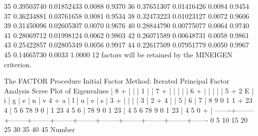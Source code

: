 \documentclass{article}
\begin{document}
\begin{Woutput}
  35    0.39503740    0.01852433        0.0088        0.9370
  36    0.37651307    0.01416426        0.0084        0.9454
  37    0.36234881    0.03761658        0.0081        0.9534
  38    0.32473223    0.01023127        0.0072        0.9606
  39    0.31450096    0.02605307        0.0070        0.9676
  40    0.28844790    0.00775077        0.0064        0.9740
  41    0.28069712    0.01998124        0.0062        0.9803
  42    0.26071589    0.00648731        0.0058        0.9861
  43    0.25422857    0.02805349        0.0056        0.9917
  44    0.22617509    0.07951779        0.0050        0.9967
  45    0.14665730                      0.0033        1.0000
12 factors will be retained by the MINEIGEN criterion.

The FACTOR Procedure
Initial Factor Method: Iterated Principal Factor Analysis
Scree Plot of Eigenvalues
    |
  8 +
    |
    |
    |        1
    |
    |
  7 +
    |
    |
    |
    |
    |
  6 +
    |
    |
    |
    |
    |
  5 +          2
E   |
i   |
g   |
e   |
n   |
v 4 +
a   |
l   |
u   |
e   |
s   |
  3 +
    |
    |
    |
    |           3
    |
  2 +             4
    |
    |               5
    |                 6
    |                   7
    |                    8 9 0 1
  1 +                            23 4
    |                                 5 6 78 9 0
    |                                            1 23 4 5 6
    |                                                       78 9 0 1 23
    |                                                                   4 5 6 78 9 0 1 23
    |                                                                                     4 5
  0 +
    |
    -------+--------+--------+--------+--------+--------+--------+--------+--------+--------+-------
           0        5       10       15       20       25       30       35       40       45
                                                 Number


\end{Woutput}
\end{document}
